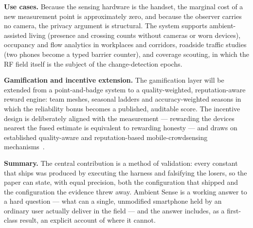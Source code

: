 \documentclass[journal,10pt]{IEEEtran}
\begin{document}
\textbf{Use cases.} Because the sensing hardware is the handset, the marginal
cost of a new measurement point is approximately zero, and because the observer
carries no camera, the privacy argument is structural. The system supports
ambient-assisted living (presence and crossing counts without cameras or worn
devices), occupancy and flow analytics in workplaces and corridors, roadside
traffic studies (two phones become a typed barrier counter), and coverage
scouting, in which the RF field itself is the subject of the change-detection
epochs.

\textbf{Gamification and incentive extension.} The gamification layer will be
extended from a point-and-badge system to a quality-weighted, reputation-aware
reward engine: team meshes, seasonal ladders and accuracy-weighted seasons in
which the reliability bonus becomes a published, auditable score. The incentive
design is deliberately aligned with the measurement --- rewarding the devices
nearest the fused estimate is equivalent to rewarding honesty --- and draws on
established quality-aware and reputation-based mobile-crowdsensing
mechanisms~\cite{zhang2022,wang2018}.

\textbf{Summary.} The central contribution is a method of validation: every
constant that ships was produced by executing the harness and falsifying the
losers, so the paper can state, with equal precision, both the configuration
that shipped and the configuration the evidence threw away. Ambient Sense is a
working answer to a hard question --- what can a single, unmodified smartphone
held by an ordinary user actually deliver in the field --- and the answer
includes, as a first-class result, an explicit account of where it cannot.
\end{document}
